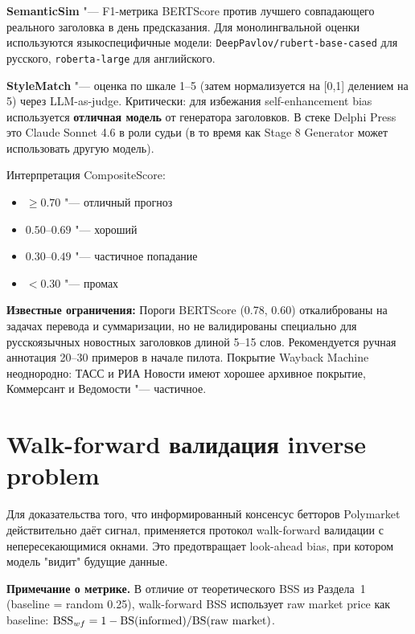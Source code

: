 \textbf{SemanticSim} "--- F1-метрика BERTScore против лучшего совпадающего реального заголовка в день предсказания. Для монолингвальной оценки используются языкоспецифичные модели: \texttt{DeepPavlov/rubert-base-cased} для русского, \texttt{roberta-large} для английского.

\textbf{StyleMatch} "--- оценка по шкале 1--5 (затем нормализуется на [0,1] делением на 5) через LLM-as-judge. Критически: для избежания self-enhancement bias используется \textbf{отличная модель} от генератора заголовков. В стеке Delphi Press это Claude Sonnet 4.6 в роли судьи (в то время как Stage 8 Generator может использовать другую модель).

Интерпретация CompositeScore:
\begin{itemize}
    \item $\geq 0.70$ "--- отличный прогноз
    \item $0.50$--$0.69$ "--- хороший
    \item $0.30$--$0.49$ "--- частичное попадание
    \item $< 0.30$ "--- промах
\end{itemize}

\textbf{Известные ограничения:} Пороги BERTScore (0.78, 0.60) откалиброваны на задачах перевода и суммаризации, но не валидированы специально для русскоязычных новостных заголовков длиной 5--15 слов. Рекомендуется ручная аннотация 20--30 примеров в начале пилота. Покрытие Wayback Machine неоднородно: ТАСС и РИА Новости имеют хорошее архивное покрытие, Коммерсант и Ведомости "--- частичное.


\section{Walk-forward валидация inverse problem}

Для доказательства того, что информированный консенсус бетторов Polymarket действительно даёт сигнал, применяется протокол walk-forward валидации с непересекающимися окнами. Это предотвращает look-ahead bias, при котором модель "видит" будущие данные.

\textbf{Примечание о метрике.} В отличие от теоретического BSS из Раздела~1 (baseline = random 0.25), walk-forward BSS использует raw market price как baseline: $\mathrm{BSS}_{wf} = 1 - \mathrm{BS}(\text{informed}) / \mathrm{BS}(\text{raw market})$.

